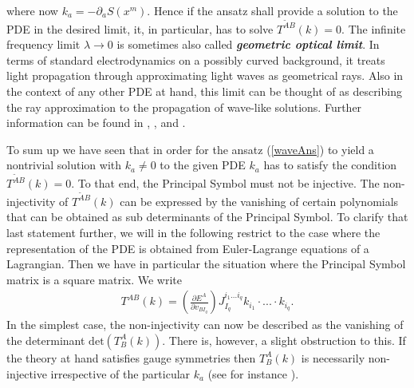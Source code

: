 \documentclass[a4paper,12pt, DIV=14, BCOR=5mm, twoside, headsepline, numbers=noenddot]{scrbook}
\begin{document}
where now $k_a = - \partial_aS(x^m)$. Hence if the ansatz shall provide a solution to the PDE in the desired limit, it, in particular, has to solve $T^{\tilde{A} B}(k) = 0$. The infinite frequency limit $\lambda \rightarrow 0 $ is sometimes also called \textit{\textbf{geometric optical limit}}. In terms of standard electrodynamics on a possibly curved background, it treats light propagation through approximating light waves as geometrical rays. Also in the context of any other PDE at hand, this limit can be thought of as describing the ray approximation to the propagation of wave-like solutions. Further information can be found in \cite{seiler1994analysis}, \cite{2012arXiv1211.1914K}, \cite{2011PhRvD..83d4047R} and \cite{2018PhRvD..97h4036D}.

To sum up we have seen that in order for the ansatz (\ref{waveAns}) to yield a nontrivial solution with $k_a \neq 0$ to the given PDE $k_a$ has to satisfy the condition $T^{\tilde{A} B}(k) = 0$. To that end, the Principal Symbol must not be injective. The non-injectivity of $T^{\tilde{A} B}(k)$ can be expressed by the vanishing of certain polynomials that can be obtained as sub determinants of the Principal Symbol. To clarify that last statement further, we will in the following restrict to the case where the representation of the PDE is obtained from Euler-Lagrange equations of a Lagrangian. Then we have in particular the situation where the Principal Symbol matrix is a square matrix. We write 
\begin{align}
T^{A B}(k) =  \left ( \frac{\partial E^{A}}{\partial v_{BI_q}} \right ) J_{I_q}^{i_1...i_q} k_{i_1} \cdot ... \cdot k_{i_q}.
\end{align}
In the simplest case, the non-injectivity can now be described as the vanishing of the determinant $\mathrm{det}(T^A_B(k))$. There is, however, a slight obstruction to this. If the theory at hand satisfies gauge symmetries then $T^A_B(k)$ is necessarily non-injective irrespective of the particular $k_a$ (see for instance \cite{2018PhRvD..97h4036D}).
\end{document}
